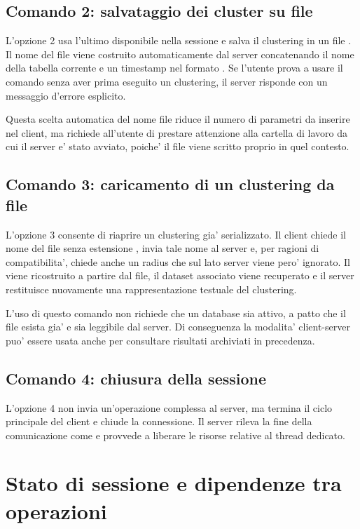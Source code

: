 \subsection{Comando 2: salvataggio dei cluster su file}

L'opzione 2 usa l'ultimo  disponibile nella sessione e salva il
clustering in un file . Il nome del file viene costruito automaticamente dal
server concatenando il nome della tabella corrente e un timestamp nel formato
. Se l'utente prova a usare il comando senza aver prima eseguito
un clustering, il server risponde con un messaggio d'errore esplicito.

Questa scelta automatica del nome file riduce il numero di parametri da inserire nel
client, ma richiede all'utente di prestare attenzione alla cartella di lavoro da cui il
server e' stato avviato, poiche' il file viene scritto proprio in quel contesto.

\subsection{Comando 3: caricamento di un clustering da file}

L'opzione 3 consente di riaprire un clustering gia' serializzato. Il client chiede il
nome del file senza estensione , invia tale nome al server e, per ragioni di
compatibilita', chiede anche un radius che sul lato server viene pero' ignorato. Il
 viene ricostruito a partire dal file, il dataset associato viene
recuperato e il server restituisce nuovamente una rappresentazione testuale del clustering.

L'uso di questo comando non richiede che un database sia attivo, a patto che il file
 esista gia' e sia leggibile dal server. Di conseguenza la modalita'
client-server puo' essere usata anche per consultare risultati archiviati in precedenza.

\subsection{Comando 4: chiusura della sessione}

L'opzione 4 non invia un'operazione complessa al server, ma termina il ciclo principale
del client e chiude la connessione. Il server rileva la fine della comunicazione come
 e provvede a liberare le risorse relative al thread dedicato.

\section{Stato di sessione e dipendenze tra operazioni}

